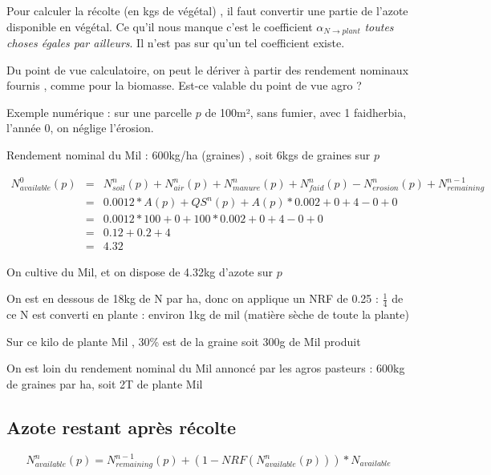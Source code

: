 \documentclass[10pt,a4paper,french]{article} %
\begin{document}
  




Pour calculer la récolte (en kgs de végétal) , il faut convertir une partie de l'azote disponible en végétal.
Ce qu'il nous manque c'est le coefficient $\alpha_{N \rightarrow plant}$  \emph{toutes choses égales par ailleurs}. Il n'est pas sur qu'un tel coefficient existe.




\begin{tcolorbox}[noparskip,
    colback=LightGreen,colframe=DarkGreen,%
    colbacklower=LimeGreen!75!LightGreen,%
    title=Question/Problème]

Du point de vue calculatoire, on peut le dériver à partir des rendement nominaux fournis , comme pour la biomasse. Est-ce valable du point de vue agro ? 

\end{tcolorbox}


Exemple numérique : 
sur une parcelle $p$ de 100m², sans fumier, avec 1 faidherbia, l'année 0, on néglige l'érosion.

Rendement nominal du Mil : 600kg/ha (graines) , soit 6kgs de graines sur $p$

\begin{eqnarray*}
N_{available}^{0}(p)&=&N_{soil}^{n}(p)  +N_{air}^{n}(p)+N_{manure}^{n}(p)+N_{faid}^{n}(p)-N_{erosion}^n(p) + N_{remaining}^{n-1} \\
                    &=& 0.0012 * A(p) + QS^{n}(p) + A(p) * 0.002 +0                +4              -0                + 0  \\
                    &=&  0.0012 * 100 + 0 + 100 * 0.002 +0+4-0 + 0  \\
                    &=&  0.12 + 0.2 +4  \\
                    &=& 4.32
\end{eqnarray*}

On cultive  du Mil, et on dispose de 4.32kg d'azote sur $p$

On est en dessous de 18kg de N par ha, donc on applique un NRF de 0.25 : $\frac{1}{4}$ de ce N est converti en plante : environ 1kg de mil (matière sèche de toute la plante)

Sur ce kilo de plante Mil , 30\% est de la graine soit 300g de Mil produit

On est loin du rendement nominal du Mil annoncé par les agros pasteurs : 600kg de graines par ha, soit 2T de plante Mil 







\subsection{Azote restant après récolte}


\begin{equation}
N_{available}^{n}(p)=N_{remaining}^{n-1}(p) + (1 - NRF(N_{available}^{n}(p))) * N_{available}
\end{equation}
\end{document}
